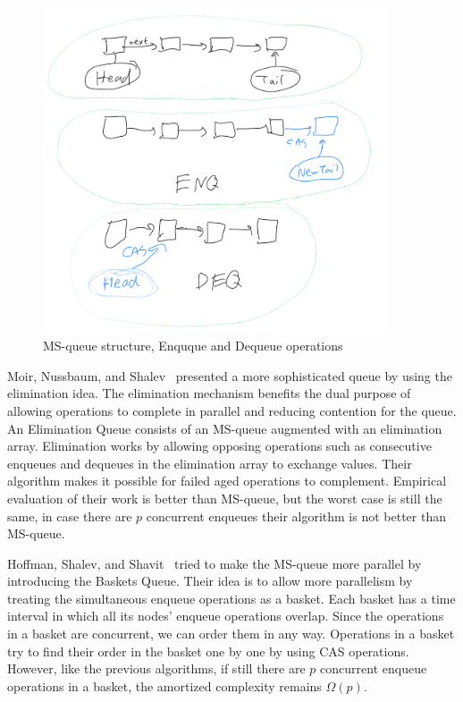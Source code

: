 \documentclass[12pt]{article}
\begin{document}
\begin{figure}[hbt]
  \center\includegraphics[width=4in]{pics/msq}
  \caption{MS-queue structure, Enquque and Dequeue operations}
\end{figure}


Moir, Nussbaum, and Shalev~\cite{DBLP:conf/spaa/MoirNSS05} presented a more sophisticated queue by using the elimination idea. The elimination mechanism benefits the dual purpose of allowing operations to complete in parallel and reducing contention for the queue. An Elimination Queue consists of an MS-queue augmented with an elimination array. Elimination works by allowing opposing operations such as consecutive enqueues and dequeues in the elimination array to exchange values. Their algorithm makes it possible for failed aged operations to complement. Empirical evaluation of their work is better than MS-queue, but the worst case is still the same, in case there are $p$ concurrent enqueues their algorithm is not better than MS-queue. 


Hoffman, Shalev, and Shavit~\cite{DBLP:conf/opodis/HoffmanSS07} tried to make the MS-queue more parallel by introducing the Baskets Queue. Their idea is to allow more parallelism by treating the simultaneous enqueue operations as a basket. Each basket has a time interval in which all its nodes’ enqueue operations overlap. Since the operations in a basket are concurrent, we can order them in any way. Operations in a basket try to find their order in the basket one by one by using CAS operations. However, like the previous algorithms, if still there are $p$ concurrent enqueue operations in a basket, the amortized complexity remains $\Omega(p)$.
\end{document}
